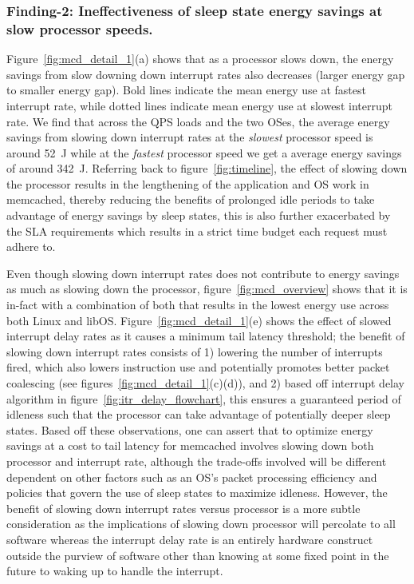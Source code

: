 \subsubsection{Finding-2: Ineffectiveness of sleep state energy savings at slow processor speeds.}
\label{sec:f2}
Figure~\ref{fig:mcd_detail_1}(a) shows that as a processor slows down, the energy savings from slow downing down interrupt rates also decreases (larger energy gap to smaller energy gap). Bold lines indicate the mean energy use at fastest interrupt rate, while dotted lines indicate mean energy use at slowest interrupt rate. We find that across the QPS loads and the two OSes, the average energy savings from slowing down interrupt rates at the \textit{slowest} processor speed is around \SI{52}{\joule} while at the \textit{fastest} processor speed we get a average energy savings of around \SI{342}{\joule}. Referring back to figure~\ref{fig:timeline}, the effect of slowing down the processor results in the lengthening of the application and OS work in memcached, thereby reducing the benefits of prolonged idle periods to take advantage of energy savings by sleep states, this is also further exacerbated by the SLA requirements which results in a strict time budget each request must adhere to. 

Even though slowing down interrupt rates does not contribute to energy savings as much as slowing down the processor, figure~\ref{fig:mcd_overview} shows that it is in-fact with a combination of both that results in the lowest energy use across both Linux and libOS. Figure~\ref{fig:mcd_detail_1}(e) shows the effect of slowed interrupt delay rates as it causes a minimum tail latency threshold; the benefit of slowing down interrupt rates consists of 1) lowering the number of interrupts fired, which also lowers instruction use and potentially promotes better packet coalescing (see figures~\ref{fig:mcd_detail_1}(c)(d)), and 2) based off interrupt delay algorithm in figure~\ref{fig:itr_delay_flowchart}, this ensures a guaranteed period of idleness such that the processor can take advantage of potentially deeper sleep states. Based off these observations, one can assert that to optimize energy savings at a cost to tail latency for memcached involves slowing down both processor and interrupt rate, although the trade-offs involved will be different dependent on other factors such as an OS's packet processing efficiency and policies that govern the use of sleep states to maximize idleness. However, the benefit of slowing down interrupt rates versus processor is a more subtle consideration as the implications of slowing down processor will percolate to all software whereas the interrupt delay rate is an entirely hardware construct outside the purview of software other than knowing at some fixed point in the future to waking up to handle the interrupt.

